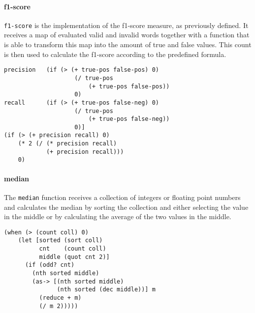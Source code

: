 \documentclass[runningheads]{llncs}
\begin{document}
\paragraph{f1-score}
\texttt{f1-score} is the implementation of the f1-score measure, as previously defined. It receives a map of evaluated valid and invalid words together with a function that is able to transform this map into the amount of true and false values. This count is then used to calculate the f1-score according to the predefined formula.
\begin{lstlisting}
precision   (if (> (+ true-pos false-pos) 0)
                    (/ true-pos
                        (+ true-pos false-pos))
                    0)
recall      (if (> (+ true-pos false-neg) 0)
                    (/ true-pos
                        (+ true-pos false-neg))
                    0)]
(if (> (+ precision recall) 0)
    (* 2 (/ (* precision recall)
            (+ precision recall)))
    0)
\end{lstlisting}

\paragraph{median}
The \texttt{median} function receives a collection of integers or floating point numbers and calculates the median by sorting the collection and either selecting the value in the middle or by calculating the average of the two values in the middle.
\begin{lstlisting}
(when (> (count coll) 0)
    (let [sorted (sort coll)
          cnt    (count coll)
          middle (quot cnt 2)]
      (if (odd? cnt)
        (nth sorted middle)
        (as-> [(nth sorted middle)
               (nth sorted (dec middle))] m
          (reduce + m)
          (/ m 2)))))
\end{lstlisting}
\end{document}

